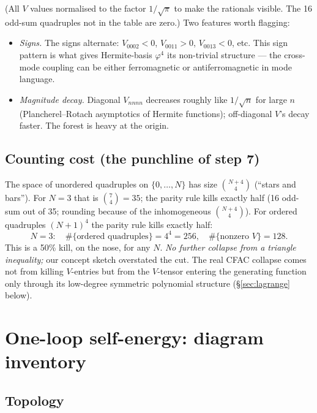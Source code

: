 \documentclass[11pt,a4paper]{article}
\begin{document}
\medskip
\noindent (All $V$ values normalised to the factor $1/\sqrt\pi$ to make the rationals
visible. The 16 odd-sum quadruples not in the table are zero.) Two features worth
flagging:
\begin{itemize}[leftmargin=2em,itemsep=2pt,topsep=2pt]
\item \emph{Signs.} The signs alternate: $V_{0002}<0$, $V_{0011}>0$, $V_{0013}<0$, etc.
This sign pattern is what gives Hermite-basis $\varphi^{4}$ its non-trivial structure ---
the cross-mode coupling can be either ferromagnetic or antiferromagnetic in mode
language.
\item \emph{Magnitude decay.} Diagonal $V_{nnnn}$ decreases roughly like $1/\sqrt{n}$ for
large $n$ (Plancherel--Rotach asymptotics of Hermite functions); off-diagonal $V$'s decay
faster. The forest is heavy at the origin.
\end{itemize}

\subsection{Counting cost (the punchline of step 7)}

The space of unordered quadruples on $\{0,\ldots,N\}$ has size $\binom{N+4}{4}$
(``stars and bars''). For $N=3$ that is $\binom{7}{4}=35$; the parity rule kills exactly
half (16 odd-sum out of 35; rounding because of the inhomogeneous $\binom{N+4}{4}$).
For ordered quadruples $(N+1)^{4}$ the parity rule kills exactly half:
\[
\boxed{\;
N=3:\quad \#\{\text{ordered quadruples}\} = 4^{4} = 256, \quad
\#\{\text{nonzero }V\} = 128.\;}
\]
This is a 50\% kill, on the nose, for any $N$. \emph{No further collapse from a triangle
inequality;} our concept sketch overstated the cut. The real CFAC collapse comes not from
killing $V$-entries but from the $V$-tensor entering the generating function only through
its low-degree symmetric polynomial structure (\S\ref{sec:lagrange} below).

\section{One-loop self-energy: diagram inventory}

\subsection{Topology}
\end{document}
